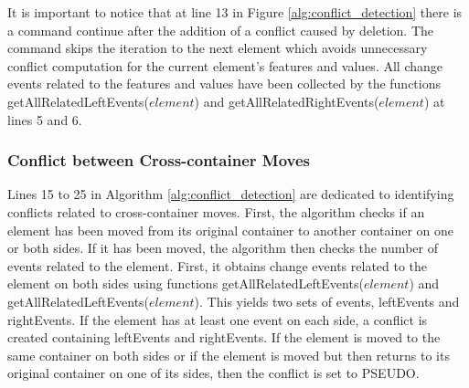 It is important to notice that at line 13 in Figure \ref{alg:conflict_detection} there is a command \textsf{continue} after the addition of a conflict caused by deletion. The command skips the iteration to the next element which avoids unnecessary conflict computation for the current element’s features and values. All change events related to the features and values have been collected by the functions \textsf{getAllRelatedLeftEvents($element$)} and \textsf{getAllRelatedRightEvents($element$)} at lines 5 and 6.

\subsubsection{Conflict between Cross-container Moves}
\label{sec:move_conflict}
Lines 15 to 25 in Algorithm \ref{alg:conflict_detection} are dedicated to identifying conflicts related to cross-container moves.
First, the algorithm checks if an element has been moved from its original container to another container on one or both sides.
If it has been moved, the algorithm then checks the number of events related to the element. First, it obtains change events related to the element on
both sides using functions \textsf{getAllRelatedLeftEvents($element$)} and \textsf{getAllRelatedLeftEvents($element$)}. This yields two sets of events,
\textsf{leftEvents} and \textsf{rightEvents}. If the element has at least one event on each side,
a conflict is created containing \textsf{leftEvents} and \textsf{rightEvents}.
If the element is moved to the same container on both sides or if the element is moved but then returns to its original container on one of its sides, then the conflict is set to \textsf{PSEUDO}.

